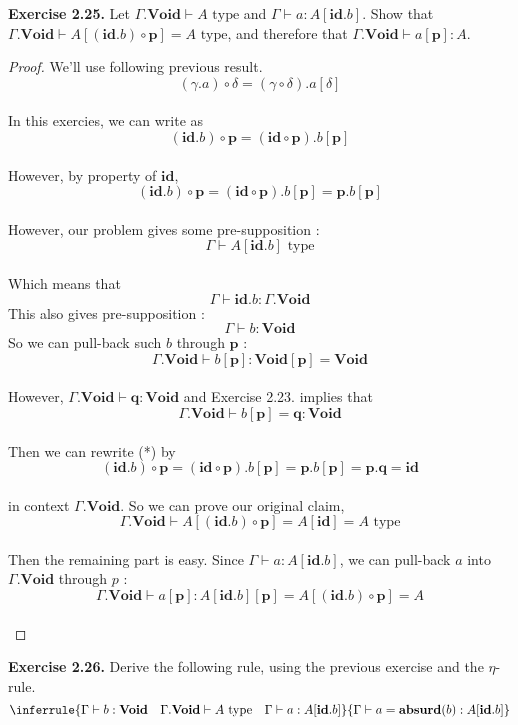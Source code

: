 \documentclass[12pt, letterpaper]{amsart}
\theoremstyle{definition}
\theoremstyle{remark}
\theoremstyle{plain}
\numberwithin{equation}{section}
\begin{document}
\newpage 

\textbf{Exercise 2.25.} Let $\Gamma.\mathbf{Void} \vdash A \text{ type}$ and $\Gamma \vdash a : A[\mathbf{id}.b]$. Show that 
$\Gamma.\mathbf{Void} \vdash A[(\mathbf{id}.b) \circ \mathbf{p}] = A \text{ type}$, and therefore that $\Gamma.\mathbf{Void} \vdash a[\mathbf{p}] : A$. 

\begin{proof}
    
We'll use following previous result. 
\[(\gamma.a) \circ \delta = (\gamma \circ \delta).a[\delta]\]
\\
In this exercies, we can write as 
\[(\mathbf{id}.b) \circ \mathbf{p} = (\mathbf{id} \circ \mathbf{p}).b[\mathbf{p}]\]
\\
However, by property of $\mathbf{id}$, 
\[(\mathbf{id}.b) \circ \mathbf{p} = (\mathbf{id} \circ \mathbf{p}).b[\mathbf{p}] = \mathbf{p}.b[\mathbf{p}]\tag{*}\] \\
However, our problem gives some pre-supposition : 
\[\Gamma \vdash A[\mathbf{id}.b] \text{ type}\] \\
Which means that 
\[\Gamma \vdash \mathbf{id}.b : \Gamma.\mathbf{Void}\] 
This also gives pre-supposition : 
\[\Gamma \vdash b : \mathbf{Void}\] 
So we can pull-back such $b$ through $\mathbf{p}$ : 
\[\Gamma.\mathbf{Void} \vdash b[\mathbf{p}] : \mathbf{Void}[\mathbf{p}] = \mathbf{Void}\] \\
However, $\Gamma.\mathbf{Void} \vdash \mathbf{q} : \mathbf{Void}$ and Exercise 2.23. implies that 
\[\Gamma.\mathbf{Void} \vdash b[\mathbf{p}] = \mathbf{q} : \mathbf{Void}\] \\
Then we can rewrite (*) by 
\[\]\[(\mathbf{id}.b) \circ \mathbf{p} = (\mathbf{id} \circ \mathbf{p}).b[\mathbf{p}] = \mathbf{p}.b[\mathbf{p}] = \mathbf{p}.\mathbf{q} = \mathbf{id}\] \\
in context $\Gamma.\mathbf{Void}$. So we can prove our original claim, 
\[\Gamma.\mathbf{Void} \vdash A[(\mathbf{id}.b) \circ \mathbf{p}] = A[\mathbf{id}] = A \text{ type}\] \\
Then the remaining part is easy. Since $\Gamma \vdash a : A[\mathbf{id}.b]$, we can pull-back $a$ into $\Gamma.\mathbf{Void}$ through $p$ : 
\[\Gamma.\mathbf{Void} \vdash a[\mathbf{p}] : A[\mathbf{id}.b][\mathbf{p}] = A[(\mathbf{id}.b)\circ \mathbf{p}] = A\] \\
\end{proof}

\newpage 

\textbf{Exercise 2.26.} Derive the following rule, using the previous exercise and the $\eta$-rule. 
\[
\inferrule
{
    \Gamma \vdash b : \mathbf{Void} \quad \Gamma.\mathbf{Void} \vdash A \text{ type} \quad \Gamma \vdash a : A[\mathbf{id}.b]
}
{
    \Gamma \vdash a = \mathbf{absurd}(b) : A[\mathbf{id}.b]
}
\] 
\end{document}
